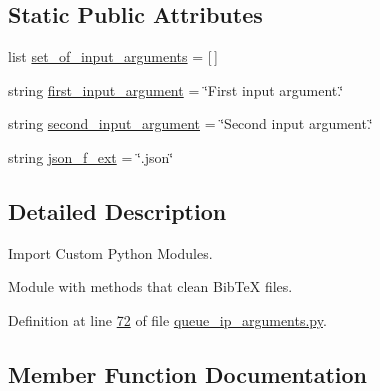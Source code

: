 \subsection*{Static Public Attributes}
\begin{DoxyCompactItemize}
\item 
list \hyperlink{classutilities_1_1queue__ip__arguments_1_1queue__ip__args_acc8e7685be71a7f95ede7c980355c9f3}{set\+\_\+of\+\_\+input\+\_\+arguments} = \mbox{[}$\,$\mbox{]}
\item 
string \hyperlink{classutilities_1_1queue__ip__arguments_1_1queue__ip__args_a14394c9820086e09d5b926d9910a180f}{first\+\_\+input\+\_\+argument} = \char`\"{}First input argument.\char`\"{}
\item 
string \hyperlink{classutilities_1_1queue__ip__arguments_1_1queue__ip__args_a0b179a70c0e57de2794d0d532e534c9c}{second\+\_\+input\+\_\+argument} = \char`\"{}Second input argument.\char`\"{}
\item 
string \hyperlink{classutilities_1_1queue__ip__arguments_1_1queue__ip__args_a8d93f9ade7608583602a9948c0d744f7}{json\+\_\+f\+\_\+ext} = \char`\"{}.json\char`\"{}
\end{DoxyCompactItemize}


\subsection{Detailed Description}
Import Custom Python Modules. 

Module with methods that clean Bib\+Te\+X files. 

Definition at line \hyperlink{queue__ip__arguments_8py_source_l00072}{72} of file \hyperlink{queue__ip__arguments_8py_source}{queue\+\_\+ip\+\_\+arguments.\+py}.



\subsection{Member Function Documentation}
\hypertarget{classutilities_1_1queue__ip__arguments_1_1queue__ip__args_a1a87ae4035acfa51fe1d1aff53f770f3}{}

